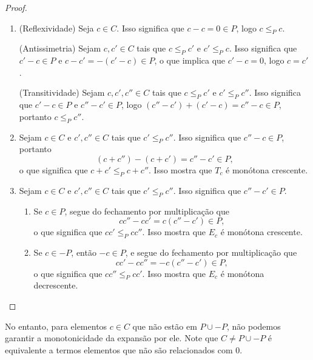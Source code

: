 \begin{proof}
	\begin{enumerate}
	\item (Reflexividade) Seja $c \in C$. Isso significa que $c-c =0 \in P$, logo $c \leq_P c$.

(Antissimetria) Sejam $c,c' \in C$ tais que $c \leq_P c'$ e $c' \leq_P c$. Isso significa que $c'-c \in P$ e $c-c'=-(c'-c) \in P$, o que implica que $c'-c=0$, logo $c=c'$.

(Transitividade) Sejam $c,c',c'' \in C$ tais que $c \leq_P c'$ e $c' \leq_P c''$. Isso significa que $c'-c \in P$ e $c''-c' \in P$, logo $(c''-c') + (c'-c) = c''-c \in P$, portanto $c \leq_P c''$.

	\item Sejam $c \in C$ e $c',c'' \in C$ tais que $c' \leq_P c''$. Isso significa que $c''-c \in P$, portanto
	\begin{equation*}
	(c+c'') - (c+c') = c''-c' \in P,
	\end{equation*}
o que significa que $c+c' \leq_P c+c''$. Isso mostra que $T_c$ é monótona crescente.

	\item Sejam $c \in C$ e $c',c'' \in C$ tais que $c' \leq_P c''$. Isso significa que $c''-c' \in P$.
		\begin{enumerate}
		\item Se $c \in P$, segue do fechamento por multiplicação que
	\begin{equation*}
	cc''-cc' = c(c''-c') \in P,
	\end{equation*}
o que significa que $cc' \leq_P cc''$. Isso mostra que $E_c$ é monótona crescente.

		\item Se $c \in -P$, então $-c \in P$, e segue do fechamento por multiplicação que
	\begin{equation*}
	cc'-cc'' = -c(c''-c') \in P,
	\end{equation*}
o que significa que $cc'' \leq_P cc'$. Isso mostra que $E_c$ é monótona decrescente.
		\end{enumerate}
	\end{enumerate}
\end{proof}

No entanto, para elementos $c \in C$ que não estão em $P \cup -P$, não podemos garantir a monotonicidade da expansão por ele. Note que $C \neq P \cup -P$ é equivalente a termos elementos que não são relacionados com $0$.

